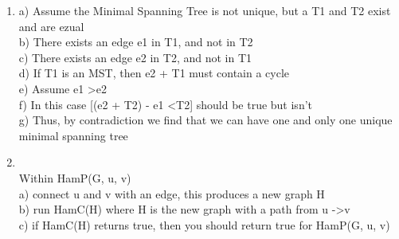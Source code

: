 \documentclass[11pt]{article}
\begin{document}
\begin{enumerate}
\item
            \tab a) Assume the Minimal Spanning Tree is not unique, but a T1 and T2 exist and are ezual \\
            \tab b) There exists an edge e1 in T1, and not in T2 \\
            \tab c) There exists an edge e2 in T2, and not in T1 \\
            \tab d) If T1 is an MST, then e2 + T1 must contain a cycle \\
            \tab e) Assume e1 \textgreater  e2 \\
            \tab f) In this case [(e2 + T2) - e1 \textless  T2] should be true but isn't \\
            \tab g) Thus, by contradiction we find that we can have one and only one unique minimal spanning tree \\

\item \\
    \tab Within HamP(G, u, v)\\
    \tab a) connect u and v with an edge, this produces a new graph H\\
    \tab b) run HamC(H) where H is the new graph with a path from u -\textgreater v\\
    \tab c) if HamC(H) returns true, then you should return true for HamP(G, u, v)\\

\end{enumerate}
\end{document}
